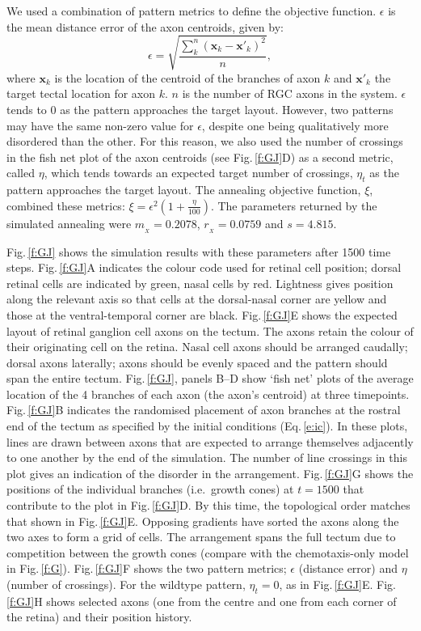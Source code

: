 \documentclass[11pt, a4paper]{article}
\begin{document}
We used a combination of pattern metrics to define the objective function. $\epsilon$ is the mean distance error of the axon centroids, given by:
%
\begin{equation}\label{e:eps}
\epsilon = \sqrt{\frac{\sum_k^n (\mathbf{x}_{k} - \mathbf{x}'_{k})^2}{n}},
\end{equation}
%
where $\mathbf{x}_{k}$ is the location of the centroid of the branches of axon $k$ and $\mathbf{x}'_{k}$ the target tectal location for axon $k$.
$n$ is the number of RGC axons in the system.
%
$\epsilon$ tends to 0 as the pattern approaches the target layout.
However, two patterns may have the same non-zero value for $\epsilon$, despite one being qualitatively more disordered than the other.
For this reason, we also used the number of crossings in the fish net plot of the axon centroids (see Fig.\,\ref{f:GJ}D) as a second metric, called $\eta$, which tends towards an expected target number of crossings, $\eta_t$ as the pattern approaches the target layout. The annealing objective function, $\xi$, combined these metrics: $\xi = \epsilon^2 (1+\frac{\eta}{100})$.
The parameters returned by the simulated annealing were
$m_{\!_X} = 0.2078$, $r_{\!_X} = 0.0759$ and $s = 4.815$.

Fig.\,\ref{f:GJ} shows the simulation results with these parameters after 1500 time steps.
Fig.\,\ref{f:GJ}A indicates the colour code used for retinal cell position; dorsal retinal cells are indicated by green, nasal cells by red. Lightness gives position along the relevant axis so that cells at the dorsal-nasal corner are yellow and those at the ventral-temporal corner are black.
Fig.\,\ref{f:GJ}E shows the expected layout of retinal ganglion cell axons on the tectum.
The axons retain the colour of their originating cell on the retina.
Nasal cell axons should be arranged caudally; dorsal axons laterally; axons should be evenly spaced and the pattern should span the entire tectum.
Fig.\,\ref{f:GJ}, panels B--D show `fish net' plots of the average location of the 4 branches of each axon (the axon's centroid) at three timepoints.
Fig.\,\ref{f:GJ}B indicates the randomised placement of axon branches at the rostral end of the tectum as specified by the initial conditions (Eq.\,\ref{e:ic}).
In these plots, lines are drawn between axons that are expected to arrange themselves adjacently to one another by the end of the simulation.
The number of line crossings in this plot gives an indication of the disorder in the arrangement.
Fig.\,\ref{f:GJ}G shows the positions of the individual branches (i.e.~growth cones) at $t=1500$ that contribute to the plot in Fig.\,\ref{f:GJ}D.
By this time, the topological order matches that shown in Fig.\,\ref{f:GJ}E.
Opposing gradients have sorted the axons along the two axes to form a grid of cells.
The arrangement spans the full tectum due to competition between the growth cones (compare with the chemotaxis-only model in Fig.\,\ref{f:G}).
Fig.\,\ref{f:GJ}F shows the two pattern metrics; $\epsilon$ (distance error) and $\eta$ (number of crossings).
For the wildtype pattern, $\eta_t=0$, as in Fig.\,\ref{f:GJ}E.
Fig.\,\ref{f:GJ}H shows selected axons (one from the centre and one from each corner of the retina) and their position history.
\end{document}
